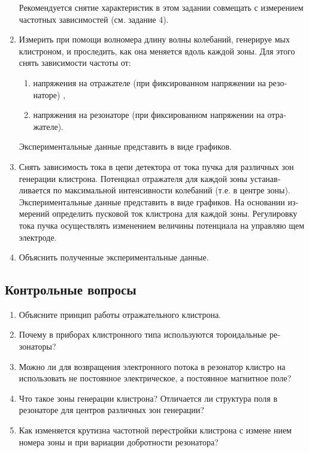 \begin{enumerate}
	Рекомендуется снятие характеристик в этом задании совмещать с изме­рением частотных зависимостей (см. задание 4).

	\item Измерить при помощи волномера длину волны колебаний, генерируе­
	мых клистроном, и проследить, как она меняется вдоль каждой зоны. Для
	этого снять зависимости частоты от:
		\begin{enumerate}
			\item  напряжения на отражателе (при фиксированном напряжении на резо­
			наторе) ,
			\item  напряжения на резонаторе (при фиксированном напряжении на отра­
			жателе).
		\end{enumerate}
	
	Экспериментальные данные представить в виде графиков.

	\item  Снять зависимость тока в цепи детектора от тока пучка для различных
	зон генерации клистрона. Потенциал отражателя для каждой зоны устанав­
	ливается по максимальной интенсивности колебаний (т.е. в центре зоны).
	Экспериментальные данные представить в виде графиков. На основании из­
	мерений определить пусковой ток клистрона для каждой зоны. Регулировку
	тока пучка осуществлять изменением величины потенциала на управляю­
	щем электроде.

	\item  Объяснить полученные экспериментальные данные.

\end{enumerate}

\subsection{Контрольные вопросы}

\begin{enumerate}
	\item Объясните принцип работы отражательного клистрона.
	\item Почему в приборах клистронного типа используются тороидальные ре­
	зонаторы?
	\item Можно ли для возвращения электронного потока в резонатор клистро­
	на использовать не постоянное электрическое, а постоянное магнитное поле?
	\item Что такое зоны генерации клистрона? Отличается ли структура поля
	в резонаторе для центров различных зон генерации?
	\item Как изменяется крутизна частотной перестройки клистрона с измене­
	нием номера зоны и при вариации добротности резонатора?
\end{enumerate}
